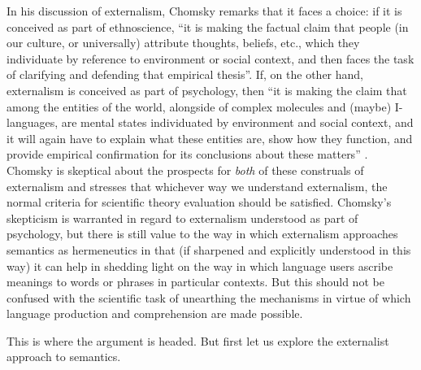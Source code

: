 In his discussion of externalism, Chomsky remarks that it faces a choice: if it is conceived as part of ethnoscience, “it is making the factual claim that people (in our culture, or universally) attribute thoughts, beliefs, etc., which they individuate by reference to environment or social context, and then faces the task of clarifying and defending that empirical thesis”. If, on the other hand, externalism is conceived as part of psychology, then “it is making the claim that among the entities of the world, alongside of complex molecules and (maybe) I-languages, are mental states individuated by environment and social context, and it will again have to explain what these entities are, show how they function, and provide empirical confirmation for its conclusions about these matters” \citep[269-270]{Chomsky2003}. Chomsky is skeptical about the prospects for \textit{both} of these construals of externalism and stresses that whichever way we understand externalism, the normal criteria for scientific theory evaluation should be satisfied. Chomsky’s skepticism is warranted in regard to externalism understood as part of psychology, but there is still value to the way in which externalism approaches semantics as hermeneutics in that (if sharpened and explicitly understood in this way) it can help in shedding light on the way in which language users ascribe meanings to words or phrases in particular contexts. But this should not be confused with the scientific task of unearthing the mechanisms in virtue of which language production and comprehension are made possible.

This is where the argument is headed. But first let us explore the externalist approach to semantics.